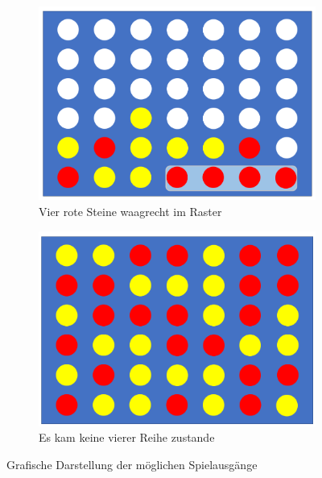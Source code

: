 \begin{figure}[H]
\begin{subfigure}{0.45\textwidth}
	\includegraphics[width=\linewidth]{images/Waagrecht}
	\caption[Vier rote Steine in Reihe waagrecht]{Vier rote Steine waagrecht im Raster}
	\label{fig:waagrecht}
\end{subfigure}\hfill
\begin{subfigure}{0.45\textwidth}
	\centering
	\includegraphics[width=\linewidth]{images/Unentschieden}
	\caption[Unentschieden]{Es kam keine vierer Reihe zustande}
	\label{fig:unentschiedent}
\end{subfigure}
\caption[Mögliche Spielausgänge]{Grafische Darstellung der möglichen Spielausgänge}
\end{figure}
%
